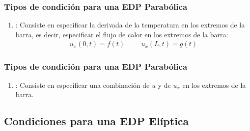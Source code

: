 \documentclass[12pt]{beamer}
\begin{document}
\begin{frame}
\frametitle{Tipos de condición para una EDP Parabólica}
\begin{enumerate}[<+->]
\conti
\item {}: Consiste en especificar la derivada de la temperatura en los extremos de la barra, es decir, especificar el flujo de calor en los extremos de la barra:
\begin{align}
u_{x}(0,t) = f(t) \hspace{1cm} u_{x}(L,t) = g(t)
\label{eq:ecuacion_06_02_04}    
\end{align}
\seti
\end{enumerate}
\end{frame}
\begin{frame}
\frametitle{Tipos de condición para una EDP Parabólica}
\begin{enumerate}[<+->]
\conti
\item {}: Consiste en especificar una combinación de $u$ y de $u_{x}$ en los extremos de la barra.
\end{enumerate}
\end{frame}

\subsection{Condiciones para una EDP Elíptica}
\end{document}
